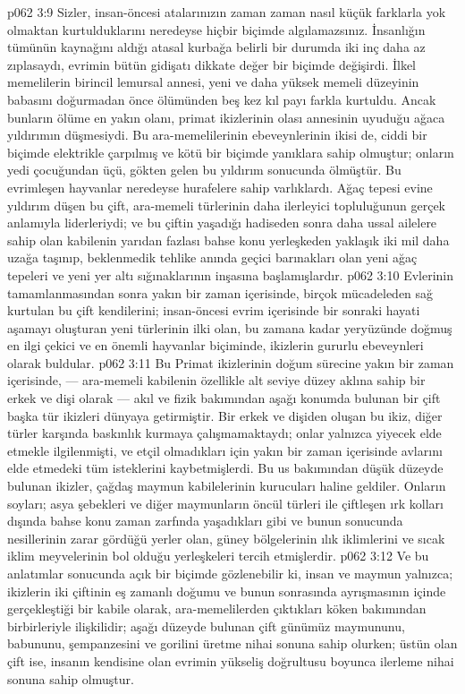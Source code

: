 \vs p062 3:9 Sizler, insan\hyp{}öncesi atalarınızın zaman zaman nasıl küçük farklarla yok olmaktan kurtulduklarını neredeyse hiçbir biçimde algılamazsınız. İnsanlığın tümünün kaynağını aldığı atasal kurbağa belirli bir durumda iki inç daha az zıplasaydı, evrimin bütün gidişatı dikkate değer bir biçimde değişirdi. İlkel memelilerin birincil lemursal annesi, yeni ve daha yüksek memeli düzeyinin babasını doğurmadan önce ölümünden beş kez kıl payı farkla kurtuldu. Ancak bunların ölüme en yakın olanı, primat ikizlerinin olası annesinin uyuduğu ağaca yıldırımın düşmesiydi. Bu ara\hyp{}memelilerinin ebeveynlerinin ikisi de, ciddi bir biçimde elektrikle çarpılmış ve kötü bir biçimde yanıklara sahip olmuştur; onların yedi çocuğundan üçü, gökten gelen bu yıldırım sonucunda ölmüştür. Bu evrimleşen hayvanlar neredeyse hurafelere sahip varlıklardı. Ağaç tepesi evine yıldırım düşen bu çift, ara\hyp{}memeli türlerinin daha ilerleyici topluluğunun gerçek anlamıyla liderleriydi; ve bu çiftin yaşadığı hadiseden sonra daha ussal ailelere sahip olan kabilenin yarıdan fazlası bahse konu yerleşkeden yaklaşık iki mil daha uzağa taşınıp, beklenmedik tehlike anında geçici barınakları olan yeni ağaç tepeleri ve yeni yer altı sığınaklarının inşasına başlamışlardır.
\vs p062 3:10 Evlerinin tamamlanmasından sonra yakın bir zaman içerisinde, birçok mücadeleden sağ kurtulan bu çift kendilerini; insan\hyp{}öncesi evrim içerisinde bir sonraki hayati aşamayı oluşturan  yeni türlerinin ilki olan, bu zamana kadar yeryüzünde doğmuş en ilgi çekici ve en önemli hayvanlar biçiminde, ikizlerin gururlu ebeveynleri olarak buldular.
\vs p062 3:11 Bu Primat ikizlerinin doğum sürecine yakın bir zaman içerisinde, --- ara\hyp{}memeli kabilenin özellikle alt seviye düzey aklına sahip bir erkek ve dişi olarak --- akıl ve fizik bakımından aşağı konumda bulunan bir çift başka tür ikizleri dünyaya getirmiştir. Bir erkek ve dişiden oluşan bu ikiz, diğer türler karşında baskınlık kurmaya çalışmamaktaydı; onlar yalnızca yiyecek elde etmekle ilgilenmişti, ve etçil olmadıkları için yakın bir zaman içerisinde avlarını elde etmedeki tüm isteklerini kaybetmişlerdi. Bu us bakımından düşük düzeyde bulunan ikizler, çağdaş maymun kabilelerinin kurucuları haline geldiler. Onların soyları; asya şebekleri ve diğer maymunların öncül türleri ile çiftleşen ırk kolları dışında bahse konu zaman zarfında yaşadıkları gibi ve bunun sonucunda nesillerinin zarar gördüğü yerler olan, güney bölgelerinin ılık iklimlerini ve sıcak iklim meyvelerinin bol olduğu yerleşkeleri tercih etmişlerdir.
\vs p062 3:12 Ve bu anlatımlar sonucunda açık bir biçimde gözlenebilir ki, insan ve maymun yalnızca; ikizlerin iki çiftinin eş zamanlı doğumu ve bunun sonrasında ayrışmasının içinde gerçekleştiği bir kabile olarak, ara\hyp{}memelilerden çıktıkları köken bakımından birbirleriyle ilişkilidir; aşağı düzeyde bulunan çift günümüz maymununu, babununu, şempanzesini ve gorilini üretme nihai sonuna sahip olurken; üstün olan çift ise, insanın kendisine olan evrimin yükseliş doğrultusu boyunca ilerleme nihai sonuna sahip olmuştur.
